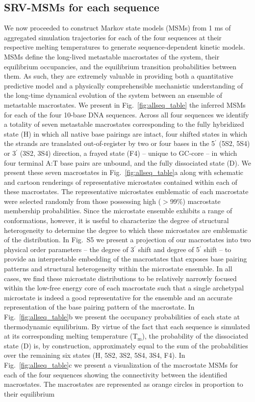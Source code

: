 \documentclass[journal=jpcbfk,manuscript=article]{achemso}
\newcommand*{\rood}[1]{{#1}}
\newcommand*{\blauw}[1]{{#1}}
\begin{document}
\subsection{SRV-MSMs for each sequence}

We now proceeded to construct Markov state models (MSMs) from 1 ms of aggregated simulation trajectories for each of the four sequences at their respective melting temperatures to generate sequence-dependent kinetic models. MSMs define the long-lived metastable macrostates of the system, their equilibrium occupancies, and the equilibrium transition probabilities between them. As such, they are extremely valuable in providing both a quantitative predictive model and a physically comprehensible mechanistic understanding of the long-time dynamical evolution of the system between an ensemble of metastable macrostates. We present in Fig.~\ref{fig:allseq_table} the inferred MSMs for each of the four 10-base DNA sequences. Across all four sequences we identify a totality of seven metastable macrostates corresponding to the fully hybridized state (H) in which all native base pairings are intact, four shifted states in which the strands are translated out-of-register by two or four bases in the 5$^\prime$ (5S2, 5S4) or 3$^\prime$ (3S2, 3S4) direction, a frayed state (F4) -- unique to GC-core -- in which four terminal A:T base pairs are unbound, and the fully dissociated state (D). We present these seven macrostates in Fig.~\ref{fig:allseq_table}a along with schematic and cartoon renderings of representative microstates contained within each of these macrostates. \rood{The representative microstates emblematic of each macrostate were selected randomly from those possessing high ($>$99\%) macrostate membership probabilities. Since the microstate ensemble exhibits a range of conformations, however, it is useful to characterize the degree of structural heterogeneity to determine the degree to which these microstates are emblematic of the distribution. In \blauw{Fig.~S5} we present a projection of our macrostates into two physical order parameters -- the degree of 3$^\prime$ shift and degree of 5$^\prime$ shift -- to provide an interpretable embedding of the macrostates that exposes base pairing patterns and structural heterogeneity within the microstate ensemble. In all cases, we find these microstate distributions to be relatively narrowly focused within the low-free energy core of each macrostate such that a single archetypal microstate is indeed a good representative for the ensemble and an accurate representation of the base pairing pattern of the macrostate.} In Fig.~\ref{fig:allseq_table}b we present the occupancy probabilities of each state at thermodynamic equilibrium. By virtue of the fact that each sequence is simulated at its corresponding melting temperature (T$_\mathrm{m}$), the probability of the dissociated state (D) is, by construction, approximately equal to the sum of the probabilities over the remaining six states (H, 5S2, 3S2, 5S4, 3S4, F\rood{4}). In Fig.~\ref{fig:allseq_table}c we present a visualization of the macrostate MSMs for each of the four sequences showing the connectivity between the identified macrostates. The macrostates are represented as orange circles in proportion to their equilibrium 
\end{document}
